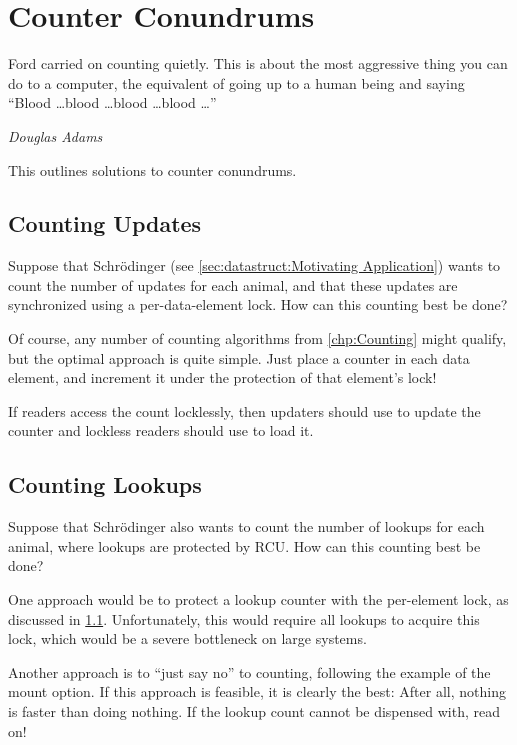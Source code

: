 
\section{Counter Conundrums}
\label{sec:together:Counter Conundrums}
%
\epigraph{Ford carried on counting quietly.
	  This is about the most aggressive thing you can do to a
	  computer, the equivalent of going up to a human being and saying
	  ``Blood \dots blood \dots blood \dots blood \dots''}
	 {\emph{Douglas Adams}}

This 
outlines solutions to counter conundrums.

\subsection{Counting Updates}
\label{sec:together:Counting Updates}

Suppose that Schr\"odinger (see
\cref{sec:datastruct:Motivating Application})
wants to count the number of updates for each animal,
and that these updates are synchronized using a per-data-element lock.
How can this counting best be done?

Of course, any number of counting algorithms from \cref{chp:Counting}
might qualify, but the optimal approach is quite simple.
Just place a counter in each data element, and increment it under the
protection of that element's lock!

If readers access the count locklessly, then updaters should use
 to update the counter and lockless readers should
use  to load it.

\subsection{Counting Lookups}
\label{sec:together:Counting Lookups}

Suppose that Schr\"odinger also wants to count the number of lookups for
each animal, where lookups are protected by RCU.
How can this counting best be done?

One approach would be to protect a lookup counter with the per-element
lock, as discussed in \cref{sec:together:Counting Updates}.
Unfortunately, this would require all lookups to acquire this lock,
which would be a severe bottleneck on large systems.

Another approach is to ``just say no'' to counting, following the example
of the  mount option.
If this approach is feasible, it is clearly the best:  After all, nothing
is faster than doing nothing.
If the lookup count cannot be dispensed with, read on!

